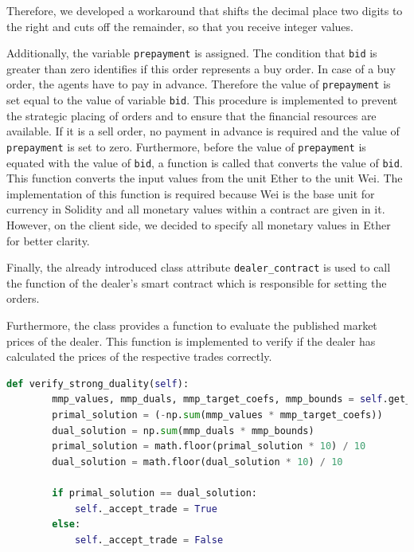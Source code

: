 Therefore, we developed a workaround that shifts the decimal place two digits to the right and cuts off the remainder,
so that you receive integer values. 

Additionally, the variable \verb|prepayment| is assigned. 
The condition that \verb|bid| is greater than zero identifies if this order represents a buy order.
In case of a buy order, the agents have to pay in advance.
Therefore the value of \verb|prepayment| is set equal to the value of variable \verb|bid|. 
This procedure is implemented to prevent the strategic placing of orders and to ensure that the financial resources are available.
If it is a sell order, no payment in advance is required and the value of \verb|prepayment| is set to zero.
Furthermore, before the value of \verb|prepayment| is equated with the value of \verb|bid|, a function is called that converts the value of \verb|bid|. This function converts the input values from the unit Ether to the unit
Wei. 
The implementation of this function is required because Wei is the base unit for currency in Solidity
and all monetary values within a contract are given in it. However, on the client side, we decided to specify all monetary values in Ether
for better clarity.

Finally, the already introduced class attribute \verb|dealer_contract| is used to call the function of the dealer's smart contract which is
responsible for setting the orders.

Furthermore, the class provides a function to evaluate the published market prices of the dealer. 
This function is implemented to verify if the dealer has calculated the prices of the respective trades 
correctly.  

\begin{lstlisting}[float=htbp, label=lst:verify_trade, caption=Verification of trades, language=Python]
    def verify_strong_duality(self):
        mmp_values, mmp_duals, mmp_target_coefs, mmp_bounds = self.get_mmp_attributes()
        primal_solution = (-np.sum(mmp_values * mmp_target_coefs))
        dual_solution = np.sum(mmp_duals * mmp_bounds)
        primal_solution = math.floor(primal_solution * 10) / 10
        dual_solution = math.floor(dual_solution * 10) / 10

        if primal_solution == dual_solution:
            self._accept_trade = True
        else:
            self._accept_trade = False
\end{lstlisting}

